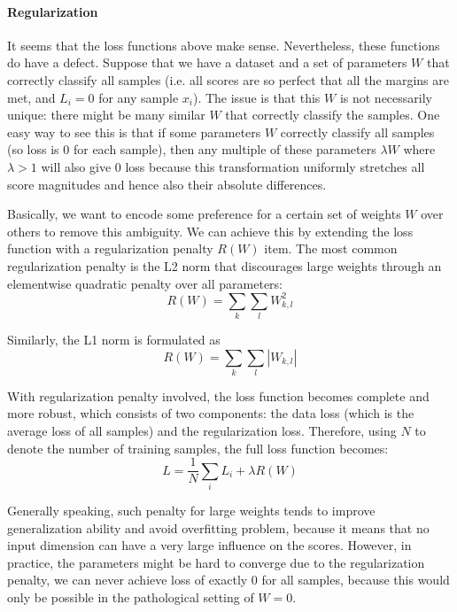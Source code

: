 \documentclass[10pt,twocolumn,letterpaper]{article}
\begin{document}
\paragraph{Regularization}
	It seems that the loss functions above make sense. Nevertheless, these functions do have a defect. Suppose that we have a dataset and a set of parameters $W$ that correctly classify all samples (i.e. all scores are so perfect that all the margins are met, and $L_i=0$ for any sample $x_{i}$). The issue is that this $W$ is not necessarily unique: there might be many similar $W$ that correctly classify the samples. One easy way to see this is that if some parameters $W$ correctly classify all samples (so loss is 0 for each sample), then any multiple of these parameters $\lambda W$ where $\lambda > 1$ will also give 0 loss because this transformation uniformly stretches all score magnitudes and hence also their absolute differences. \cite{svmCS231n}
	
	Basically, we want to encode some preference for a certain set of weights $W$ over others to remove this ambiguity. We can achieve this by extending the loss function with a regularization penalty $R(W)$ item. The most common regularization penalty is the L2 norm that discourages large weights through an elementwise quadratic penalty over all parameters:
\begin{equation}
	R(W) = \sum_{k} \sum_{l} W_{k, l}^2
\end{equation}

	Similarly, the L1 norm is formulated as 
\begin{equation}
	R(W) = \sum_{k} \sum_{l} \left|W_{k, l}\right|
\end{equation}

	With regularization penalty involved, the loss function becomes complete and more robust, which consists of two components: the data loss (which is the average loss of all samples) and the regularization loss. Therefore, using $N$ to denote the number of training samples, the full loss function becomes:
\begin{equation}
	L = \frac{1}{N} \sum_i L_i + \lambda R(W)
\end{equation}
	
	Generally speaking, such penalty for large weights tends to improve generalization ability and avoid overfitting problem, because it means that no input dimension can have a very large influence on the scores. However, in practice, the parameters might be hard to converge due to the regularization penalty, we can never achieve loss of exactly 0 for all samples, because this would only be possible in the pathological setting of $W=0$.
\end{document}
